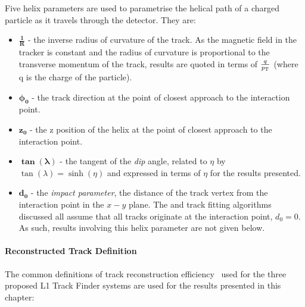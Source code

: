 Five helix parameters are used to parametrise the helical path of a charged particle as it travels through the detector.
They are:

\begin{itemize}
\item $\mathbf{\frac{1}{R}}$ - the inverse radius of curvature of the track. As the magnetic field in the tracker is constant and the radius of curvature is proportional to the transverse momentum of the track, results are quoted in terms of $\frac{q}{p_{\mathrm{T}}}$ (where q is the charge of the particle).
\item $\mathbf{\phi_{0}}$ - the track direction at the point of closest approach to the interaction point.
\item $\mathbf{z_{0}}$ - the z position of the helix at the point of closest approach to the interaction point.
\item $\mathbf{\tan(\lambda)}$ - the tangent of the \emph{dip} angle, related to $\eta$ by $\tan(\lambda) = \sinh (\eta)$ and expressed in terms of $\eta$ for the results presented.
\item $\mathbf{d_{0}}$ - the \emph{impact parameter}, \ie the distance of the track vertex from the interaction point in the $x-y$ plane. The \HT and track fitting algorithms discussed all assume that all tracks originate at the interaction point, \ie $d_{0} = 0$. As such, results involving this helix parameter are not given below.
\end{itemize}

\paragraph{Reconstructed Track Definition}
The common definitions of track reconstruction efficiency~\cite{TMTT_JINST} used for the three proposed L1 Track Finder systems are used for the results presented in this chapter:

